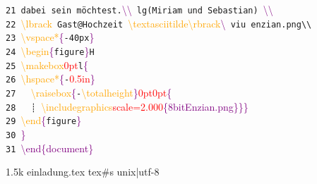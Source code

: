 \documentclass[12pt, a5paper]{article}
\newcommand{\red}[1]{\textcolor{red}{#1}}
\newcommand{\orange}[1]{\textcolor{orange}{#1}}
\newcommand{\purple}[1]{\textcolor{purple}{#1}}
\begin{document}
{ \verb!21 dabei sein möchtest.!\purple{\textbackslash\textbackslash}\verb! lg(Miriam und Sebastian) !\purple{\textbackslash\textbackslash}\\
 \verb!22 !\orange{\textbackslash lbrack}\verb! Gast@Hochzeit !\orange{\textbackslash textasciitilde\textbackslash rbrack}\purple{\textbackslash\textdollar}\verb! viu enzian.png\\!\\
 \verb!23 !\orange{\textbackslash vspace*}\purple{\{}\verb!-40px!\purple{\}}\\
 \verb!24 !\orange{\textbackslash begin}\purple{\{}\verb!figure!\purple{\}\lbrack}\verb!H!\purple{\rbrack}\\
 \verb!25 !\orange{\textbackslash makebox}\purple{\lbrack}\red{0pt}\purple{\rbrack\lbrack}\verb!l!\purple{\rbrack\{}\\
 \verb!26 !\orange{\textbackslash hspace*}\purple{\{}\verb!-!\red{0.5in}\purple{\}}\\
 \verb!27   !\orange{\textbackslash raisebox}\purple{\{}\verb!-!\orange{\textbackslash totalheight}\purple{\}\lbrack}\red{0pt}\purple{\rbrack\lbrack}\red{0pt}\purple{\rbrack\{}\\
 \verb!28   ┊ !\orange{\textbackslash includegraphics}\purple{\lbrack}\red{scale=2.000}\purple{\rbrack\{8bitEnzian.png\}\}\}}\\
 \verb!29 !\orange{\textbackslash end}\purple{\{}\verb!figure!\purple{\}}\\
 \verb!30 !\purple{\}}\\
 \verb!31 !\purple{\textbackslash end\{document\}}\\
 \mbox{}
\vfill
\begin{tcolorbox}
\newcommand{\grey}{\color{grey}}
1.5k einladung.tex tex\#s unix|utf-8
\end{tcolorbox}

}
\end{document}
